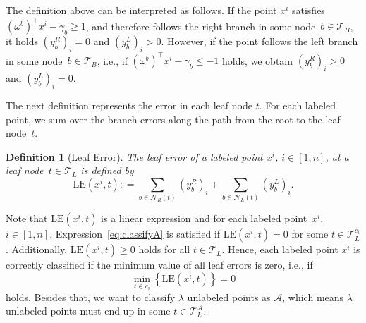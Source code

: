 \documentclass[a4paper,american,reqno]{amsart}
\newtheorem{defi}{Definition}
\newcommand{\define}{\mathrel{{\mathop:}{=}}}
\newcommand{\Set}[1]{\left\{#1\right\}}
\newcommand{\LE}{\text{LE}}
\begin{document}
The definition above can be interpreted as follows. If the point $x^i$
satisfies $(\omega^b)^\top x^i -  \gamma_b \geq 1$, and therefore
follows the right branch in some node~$b \in \mathcal{T}_B$, it holds
$(y_b^R)_i = 0$ and $(y_b^L)_i > 0$.
However, if the point follows the left branch in some node~$b \in
\mathcal{T}_B$, i.e., if $(\omega^b)^\top x^i - \gamma_b \leq -1$
holds, we obtain $(y_b^R)_i > 0$ and $(y_b^L)_i = 0$.

The next definition represents the error in each leaf node $t$. For
each labeled point, we sum over the branch errors along the path from
the root to the leaf node~$t$.

\begin{defi}[Leaf Error]
  \label{def:leaf-error}
  The \emph{leaf error} of a labeled point $x^i$, $i \in [1,n]$, at a
  leaf node~$t \in \mathcal{T}_L$ is defined by
  \begin{equation}
    \label{eq:LEab}
    \LE(x^i,t) \define
    \sum_{b \in \mathcal{N}_R(t)} \left(y_b^R\right)_i
    + \sum_{b \in \mathcal{N}_L(t)} \left(y_b^L\right)_i.
  \end{equation}
\end{defi}

Note that $\LE(x^i,t)$ is a linear expression and for each labeled
point~$x^i$, \mbox{$i \in [1,n]$}, Expression~\eqref{eq:classifyA} is
satisfied if $\LE(x^i,t) = 0$ for some $t \in \mathcal{T}_L^{c_i}$.
Additionally, $\LE(x^i,t) \geq 0$ holds for all
$t \in \mathcal{T}_{L}$.
Hence, each labeled point $x^i$ is correctly classified if the minimum
value of all leaf errors is zero, i.e., if
\begin{equation*}
  \min_{t \in c_i} \Set{\LE(x^i,t)} = 0
\end{equation*}
holds.
Besides that, we want to classify $\lambda$ unlabeled points as
$\mathcal{A}$, which means $\lambda$ unlabeled points must end up in
some $t \in \mathcal{T}_L^{\mathcal{A}}$.
\end{document}
